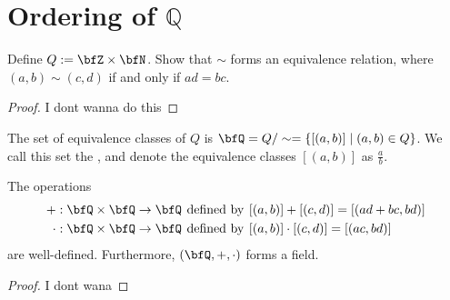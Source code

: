 \section{Ordering of $\mathbb{Q}$}
    \begin{proposition}
        Define $Q := \bfZ \times \bfN$. Show that $\sim$ forms an equivalence relation, where $(a,b) \sim (c,d)$ if and only if $ad = bc$.
    \end{proposition}
        \begin{proof}
            {\color{red} I dont wanna do this} %
        \end{proof}
    
    \begin{definition}
        The set of equivalence classes of $Q$ is $\bfQ = Q/\sim = \{ [(a,b)] \mid (a,b) \in Q\}$. We call this set the , and denote the equivalence classes $[(a,b)]$ as $\frac{a}{b}$.
    \end{definition}

    \begin{proposition}
        The operations 
            \begin{equation*}
            \begin{split}
                +:\bfQ \times \bfQ &\rightarrow \bfQ \hspace{4pt}\text{defined by}\hspace{4pt} [(a,b)] + [(c,d)] = [(ad+bc,bd)]\\
                \cdot:\bfQ \times \bfQ &\rightarrow \bfQ \hspace{4pt}\text{defined by}\hspace{4pt} [(a,b)]\cdot[(c,d)] = [(ac,bd)]\\
            \end{split}
            \end{equation*}
        are well-defined. Furthermore, $(\bfQ,+,\cdot)$ forms a field.
    \end{proposition}
        \begin{proof}
            {\color{red} I dont wana}
        \end{proof}
    
